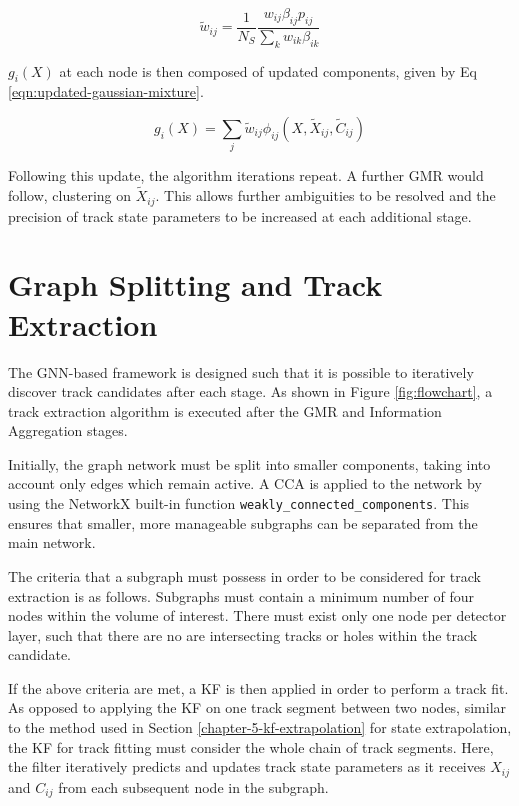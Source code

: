 \begin{equation}
\widetilde{w}_{ij} = \frac{1}{N_S} \frac{w_{ij}\beta_{ij} p_{ij}}{\sum_{k}w_{ik}\beta_{ik}}
\label{eqn:weights}
\end{equation}

$g_i(X)$ at each node is then composed of updated components, given by Eq \eqref{eqn:updated-gaussian-mixture}.

\begin{equation}
g_i(X) = \sum_{j} \widetilde{w}_{ij}\phi_{ij}(X, \widetilde{X}_{ij}, \widetilde{C}_{ij})
\label{eqn:updated-gaussian-mixture}
\end{equation}

Following this update, the algorithm iterations repeat. A further GMR would follow, clustering on $\widetilde{X}_{ij}$. This allows further ambiguities to be resolved and the precision of track state parameters to be increased at each additional stage.






\section{Graph Splitting and Track Extraction}
\label{gnn-track-extration}

The GNN-based framework is designed such that it is possible to iteratively discover track candidates after each stage. As shown in Figure \ref{fig:flowchart}, a track extraction algorithm is executed after the GMR and Information Aggregation stages.

Initially, the graph network must be split into smaller components, taking into account only edges which remain active. A CCA is applied to the network by using the NetworkX built-in function \texttt{weakly\_connected\_components}. This ensures that smaller, more manageable subgraphs can be separated from the main network.

The criteria that a subgraph must possess in order to be considered for track extraction is as follows. Subgraphs must contain a minimum number of four nodes within the volume of interest. There must exist only one node per detector layer, such that there are no are intersecting tracks or holes within the track candidate. 

If the above criteria are met, a KF is then applied in order to perform a track fit. As opposed to applying the KF on one track segment between two nodes, similar to the method used in Section \ref{chapter-5-kf-extrapolation} for state extrapolation, the KF for track fitting must consider the whole chain of track segments. Here, the filter iteratively predicts and updates track state parameters as it receives $X_{ij}$ and $C_{ij}$ from each subsequent node in the subgraph.

